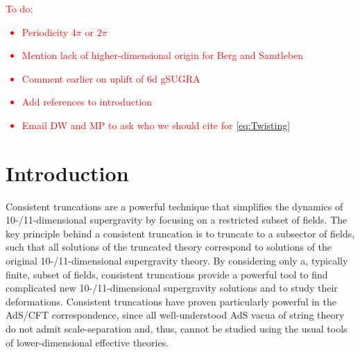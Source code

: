 \documentclass[a4paper, 11pt]{article}
\numberwithin{equation}{section}
\newcommand{\+}{\oplus}
\newcommand{\EM}[1]{\textcolor{red}{#1}}
\begin{document}
\tableofcontents
	
\newpage

\EM{To do:
\begin{itemize}
	\item Periodicity $4\pi$ or $2\pi$
	\item Mention lack of higher-dimensional origin for Berg and Samtleben
	\item Comment earlier on uplift of 6d gSUGRA
	\item Add references to introduction
	\item Email DW and MP to ask who we should cite for \eqref{eq:Twisting}
\end{itemize}
}

\section{Introduction}
Consistent truncations are a powerful technique that simplifies the dynamics of 10-/11-dimensional supergravity by focusing on a restricted subset of fields. The key principle behind a consistent truncation is to truncate to a subsector of fields, such that all solutions of the truncated theory correspond to solutions of the original 10-/11-dimensional supergravity theory. By considering only a, typically finite, subset of fields, consistent truncations provide a powerful tool to find complicated new 10-/11-dimensional supergravity solutions and to study their deformations. Consistent truncations have proven particularly powerful in the AdS/CFT correspondence, since all well-understood AdS vacua of string theory do not admit scale-separation and, thus, cannot be studied using the usual tools of lower-dimensional effective theories.
\end{document}
